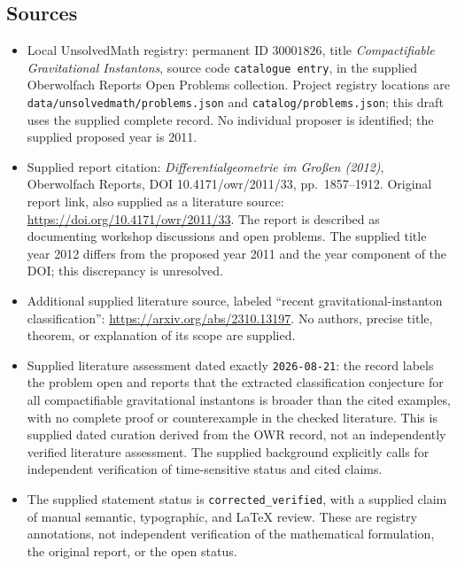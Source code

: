 \documentclass[11pt]{article}
\begin{document}
\subsection{Sources}
\begin{itemize}
\item Local UnsolvedMath registry: permanent ID \(30001826\), title \emph{Compactifiable Gravitational Instantons}, source code \texttt{catalogue entry}, in the supplied Oberwolfach Reports Open Problems collection. Project registry locations are \texttt{data/unsolvedmath/problems.json} and \texttt{catalog/problems.json}; this draft uses the supplied complete record. No individual proposer is identified; the supplied proposed year is 2011.
\item Supplied report citation: \emph{Differentialgeometrie im Großen (2012)}, Oberwolfach Reports, DOI 10.4171/owr/2011/33, pp.\ 1857--1912. Original report link, also supplied as a literature source: \url{https://doi.org/10.4171/owr/2011/33}. The report is described as documenting workshop discussions and open problems. The supplied title year 2012 differs from the proposed year 2011 and the year component of the DOI; this discrepancy is unresolved.
\item Additional supplied literature source, labeled ``recent gravitational-instanton classification'': \url{https://arxiv.org/abs/2310.13197}. No authors, precise title, theorem, or explanation of its scope are supplied.
\item Supplied literature assessment dated exactly \texttt{2026-08-21}: the record labels the problem open and reports that the extracted classification conjecture for all compactifiable gravitational instantons is broader than the cited examples, with no complete proof or counterexample in the checked literature. This is supplied dated curation derived from the OWR record, not an independently verified literature assessment. The supplied background explicitly calls for independent verification of time-sensitive status and cited claims.
\item The supplied statement status is \texttt{corrected\_verified}, with a supplied claim of manual semantic, typographic, and LaTeX review. These are registry annotations, not independent verification of the mathematical formulation, the original report, or the open status.
\end{itemize}
\end{document}
